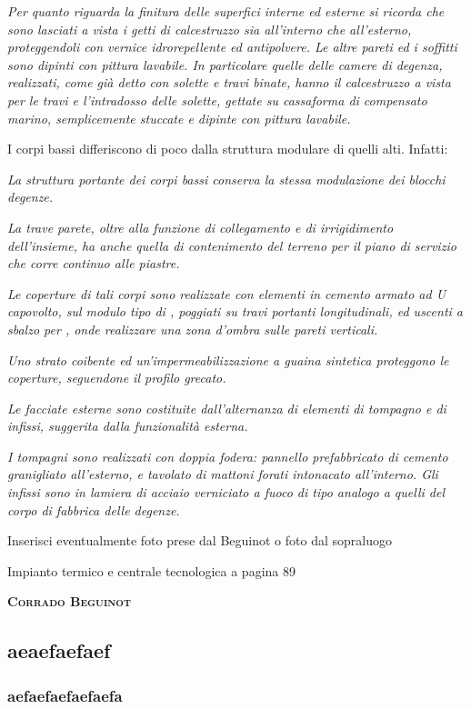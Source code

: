 \sdots

\emph{Per quanto riguarda la finitura delle superfici interne ed esterne si ricorda che sono lasciati a vista i getti di calcestruzzo sia all'interno che all'esterno, proteggendoli con vernice idrorepellente ed antipolvere. Le altre pareti ed i soffitti sono dipinti con pittura lavabile. In particolare quelle delle camere di degenza, realizzati, come già detto con solette e travi binate, hanno il calcestruzzo a vista per le travi e l'intradosso delle solette, gettate su cassaforma di compensato marino, semplicemente stuccate e dipinte con pittura lavabile.}

\vspace{0.5em}
\noindent I corpi bassi differiscono di poco dalla struttura modulare di quelli alti. Infatti:

\vspace{0.5em}

\emph{La struttura portante dei corpi bassi conserva la stessa modulazione dei blocchi degenze.}

\sdots

\emph{La trave parete, oltre alla funzione di collegamento e di irrigidimento dell'insieme, ha anche quella di contenimento del terreno per il piano di servizio che corre continuo alle piastre.}

\emph{Le coperture di tali corpi sono realizzate con elementi in cemento armato ad U capovolto, sul modulo tipo di , poggiati su travi portanti longitudinali, ed uscenti a sbalzo per , onde realizzare una zona d'ombra sulle pareti verticali.}

\sdots

\emph{Uno strato coibente ed un'impermeabilizzazione a guaina sintetica proteggono le coperture, seguendone il profilo grecato.}

\sdots

\emph{Le facciate esterne sono costituite dall'alternanza di elementi di tompagno e di infissi, suggerita dalla funzionalità esterna.}

\emph{I tompagni sono realizzati con doppia fodera: pannello prefabbricato di cemento granigliato all'esterno, e tavolato di mattoni forati intonacato all'interno. Gli infissi sono in lamiera di acciaio verniciato a fuoco di tipo analogo a quelli del corpo di fabbrica delle degenze.}

Inserisci eventualmente foto prese dal Beguinot o foto dal sopraluogo

Impianto termico e centrale tecnologica a pagina 89


\vspace{1em}
\begin{flushright}
	\textbf{\textsc{Corrado Beguinot}}
\end{flushright}
\newpage
\subsection{aeaefaefaef}
\subsubsection{aefaefaefaefaefa}